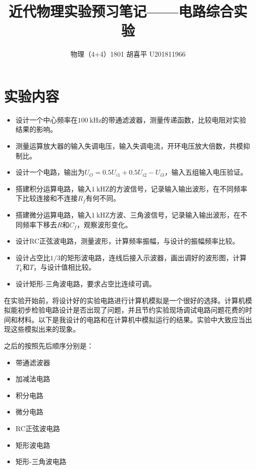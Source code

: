 \documentclass{article}
\author{物理（4+4）1801 \quad  胡喜平 \quad U201811966}
\affil{个人网站 https://hxp.plus/ \quad 电子邮件 hxp201406@gmail.com}
\title{近代物理实验预习笔记——电路综合实验}
\newcommand{\si}[1]{\  \mathrm{#1}}
\begin{document}
\maketitle

\section{实验内容}

\begin{itemize}
\item 设计一个中心频率在$100 \si{kHz}$的带通滤波器，测量传递函数，比较电阻对实验结果的影响。
\item 测量运算放大器的输入失调电压，输入失调电流，开环电压放大倍数，共模抑制比。
\item 设计一个电路，输出为$U_O = 0.5 U_{i1} + 0.5 U_{i2} - U_{i3}$，输入五组输入电压验证。
\item 搭建积分运算电路，输入$1 \si{kHZ}$的方波信号，记录输入输出波形，在不同频率下比较连接和不连接$R_f$有何不同。
\item 搭建微分运算电路，输入$1 \si{kHZ}$方波、三角波信号，记录输入输出波形，在不同频率下移去$R$和$C_f$，观察波形变化。
\item 设计RC正弦波电路，测量波形，计算频率振幅，与设计的振幅频率比较。
\item 设计占空比$1/3$的矩形波电路，连线后接入示波器，画出调好的波形图，计算$T_k$和$T$，与设计值相比较。
\item 设计矩形-三角波电路，要求占空比连续可调。
\end{itemize}

在实验开始前，将设计好的实验电路进行计算机模拟是一个很好的选择。计算机模拟能初步检验电路设计是否出现了问题，并且节约实验现场调试电路问题花费的时间和材料。以下是我设计的电路和在计算机中模拟运行的结果。实验中大致应当出现这些模拟出来的现象。

之后的按照先后顺序分别是：

\begin{itemize}
\item 带通滤波器
\item 加减法电路
\item 积分电路
\item 微分电路
\item RC正弦波电路
\item 矩形波电路
\item 矩形-三角波电路
\end{itemize}


\end{document}
